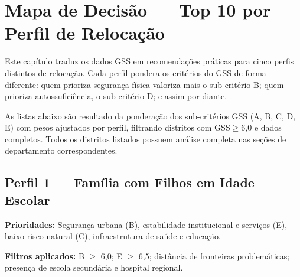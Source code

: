 \chapter{Mapa de Decisão --- Top 10 por Perfil de Relocação}\label{mapa-decisao}

Este capítulo traduz os dados GSS em recomendações práticas para cinco perfis distintos de relocação. Cada perfil pondera os critérios do GSS de forma diferente: quem prioriza segurança física valoriza mais o sub-critério B; quem prioriza autossuficiência, o sub-critério D; e assim por diante.

\medskip
As listas abaixo são resultado da ponderação dos sub-critérios GSS (A, B, C, D, E) com pesos ajustados por perfil, filtrando distritos com GSS$\geq$6,0 e dados completos. Todos os distritos listados possuem análise completa nas seções de departamento correspondentes.

\section*{Perfil 1 --- Família com Filhos em Idade Escolar}\label{perfil-familia}

\textbf{Prioridades:} Segurança urbana (B), estabilidade institucional e serviços (E), baixo risco natural (C), infraestrutura de saúde e educação.

\textbf{Filtros aplicados:} B $\geq$ 6,0; E $\geq$ 6,5; distância de fronteiras problemáticas; presença de escola secundária e hospital regional.

